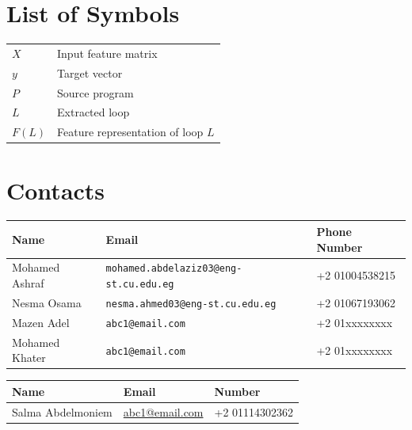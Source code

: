 \documentclass[12pt,a4paper]{report}
\begin{document}
\clearpage
\chapter*{List of Symbols}
\begin{tabular}{ll}
$X$ & Input feature matrix \\
$y$ & Target vector \\
$P$ & Source program \\
$L$ & Extracted loop \\
$F(L)$ & Feature representation of loop $L$ \\
\end{tabular}

\clearpage
\chapter*{Contacts}


\begin{table}[h!]
\centering
\small
\renewcommand{\arraystretch}{1.15}
\setlength{\tabcolsep}{4pt}

\begin{tabularx}{\textwidth}{|p{}|>{\raggedright\arraybackslash}X|p{}|}
\hline
\textbf{Name} & \textbf{Email} & \textbf{Phone Number} \\ \hline
Mohamed Ashraf & \texttt{mohamed.abdelaziz03@eng-st.cu.edu.eg} & +2 01004538215 \\ \hline
Nesma Osama & \texttt{nesma.ahmed03@eng-st.cu.edu.eg} & +2 01067193062 \\ \hline
Mazen Adel & \texttt{abc1@email.com} & +2 01xxxxxxxx \\ \hline
Mohamed Khater & \texttt{abc1@email.com} & +2 01xxxxxxxx \\ \hline
\end{tabularx}

\end{table}


\begin{table}[h!]
\centering
\begin{tabular}{|p{}|p{}|p{}|}
\hline
\textbf{Name} & \textbf{Email} & \textbf{Number} \\ \hline
Salma Abdelmoniem & \underline{abc1@email.com}  & +2 01114302362 \\ \hline
\end{tabular}
\end{table}
\end{document}
